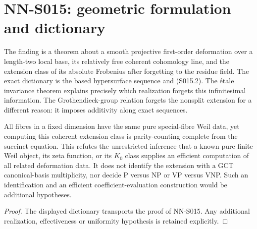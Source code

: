 \section{NN-S015: geometric formulation and dictionary}
\begin{geometricstatement}[NN-S015]
The finding is a theorem about a smooth projective first-order
deformation over a length-two local base, its relatively free
coherent cohomology line, and the extension class of its absolute
Frobenius after forgetting to the residue field. The exact
dictionary is the based hypersurface sequence and (S015.2).
The \'etale invariance theorem explains precisely which realization
forgets this infinitesimal information. The Grothendieck-group
relation forgets the nonsplit extension for a different reason:
it imposes additivity along exact sequences.

All fibres in a fixed dimension have the same pure special-fibre
Weil data, yet computing this coherent extension class is
parity-counting complete from the succinct equation. This refutes
the unrestricted inference that a known pure finite Weil object,
its zeta function, or its $K_0$ class supplies an efficient
computation of all related deformation data. It does not identify
the extension with a GCT canonical-basis multiplicity, nor decide
P versus NP or VP versus VNP. Such an identification and an efficient
coefficient-evaluation construction would be additional hypotheses.
\end{geometricstatement}
\begin{proof} The displayed dictionary transports the proof of NN-S015. Any additional realization, effectiveness or uniformity hypothesis is retained explicitly.\end{proof}


